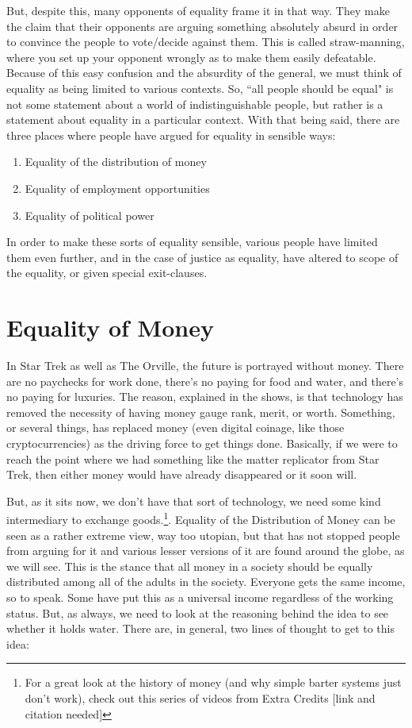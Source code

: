 But, despite this, many opponents of equality frame it in that way. They make the claim that their opponents are arguing something absolutely absurd in order to convince the people to vote/decide against them. This is called straw-manning, where you set up your opponent wrongly as to make them easily defeatable. Because of this easy confusion and the absurdity of the general, we must think of equality as being limited to various contexts. So, ``all people should be equal" is not some statement about a world of indistinguishable people, but rather is a statement about equality in a particular context. With that being said, there are three places where people have argued for equality in sensible ways:
\begin{enumerate}
    \item Equality of the distribution of money
    \item Equality of employment opportunities
    \item Equality of political power 
\end{enumerate}
In order to make these sorts of equality sensible, various people have limited them even further, and in the case of justice as equality, have altered to scope of the equality, or given special exit-clauses.

\section{Equality of Money}

In Star Trek as well as The Orville, the future is portrayed without money. There are no paychecks for work done, there's no paying for food and water, and there's no paying for luxuries. The reason, explained in the shows, is that technology has removed the necessity of having money gauge rank, merit, or worth. Something, or several things, has replaced money (even digital coinage, like those cryptocurrencies) as the driving force to get things done. Basically, if we were to reach the point where we had something like the matter replicator from Star Trek, then either money would have already disappeared or it soon will.

But, as it sits now, we don't have that sort of technology, we need some kind intermediary to exchange goods.\footnote{For a great look at the history of money (and why simple barter systems just don't work), check out this series of videos from Extra Credits [link and citation needed]}. Equality of the Distribution of Money can be seen as a rather extreme view, way too utopian, but that has not stopped people from arguing for it and various lesser versions of it are found around the globe, as we will see. This is the stance that all money in a society should be equally distributed among all of the adults in the society. Everyone gets the same income, so to speak. Some have put this as a universal income regardless of the working status. But, as always, we need to look at the reasoning behind the idea to see whether it holds water.  There are, in general, two lines of thought to get to this idea:
